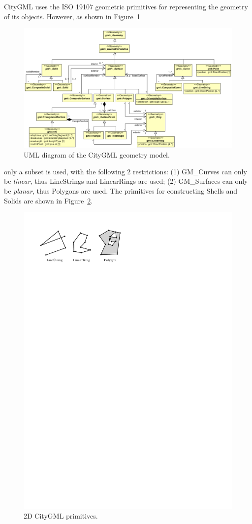\documentclass[a4paper,parskip=half,11pt]{scrartcl}
\begin{document}
CityGML uses the ISO 19107 geometric primitives for representing the geometry of its objects.
However, as shown in Figure~\ref{fig:citygmlgeom}
\begin{figure}
  \centering
  \includegraphics[width=\linewidth]{figs/citygmlgeom}
  \caption{UML diagram of the CityGML geometry model.}
\label{fig:citygmlgeom}
\end{figure}
only a subset is used, with the following 2 restrictions: (1) GM\_Curves can only be \emph{linear}, thus LineStrings and LinearRings are used; (2) GM\_Surfaces can only be \emph{planar}, thus Polygons are used.
The primitives for constructing Shells and Solids are shown in Figure~\ref{fig:citygmlprimitives}.
\begin{figure}
  \centering
  \includegraphics[width=0.8\linewidth]{figs/citygmlprimitives}
  \caption{2D CityGML primitives.}
\label{fig:citygmlprimitives}
\end{figure}
\end{document}
